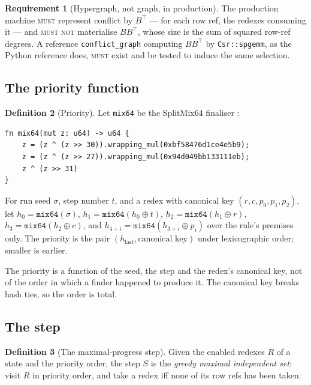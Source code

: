\documentclass[11pt,a4paper]{article}
\newcommand{\code}[1]{\texttt{#1}}
\newcommand{\MUST}{\textsc{must}}
\newcommand{\MUSTNOT}{\textsc{must not}}
\theoremstyle{definition}
\newtheorem{definition}{Definition}[section]
\newtheorem{requirement}[definition]{Requirement}
\theoremstyle{plain}
\begin{document}
\begin{requirement}[Hypergraph, not graph, in production]\label{req:hyper}
The production machine \MUST{} represent conflict by $B^{\top}$ --- for each
row ref, the redexes consuming it --- and \MUSTNOT{} materialise
$BB^{\top}$, whose size is the sum of squared row-ref degrees. A reference
\code{conflict\_graph} computing $BB^{\top}$ by \code{Csr::spgemm}, as the
Python reference does, \MUST{} exist and be tested to induce the same
selection.
\end{requirement}

\subsection{The priority function}

\begin{definition}[Priority]\label{def:prio}
Let \code{mix64} be the SplitMix64 finaliser \cite{splitmix}:
\begin{lstlisting}
fn mix64(mut z: u64) -> u64 {
    z = (z ^ (z >> 30)).wrapping_mul(0xbf58476d1ce4e5b9);
    z = (z ^ (z >> 27)).wrapping_mul(0x94d049bb133111eb);
    z ^ (z >> 31)
}
\end{lstlisting}
For run seed $\sigma$, step number $t$, and a redex with canonical key
$(r, c, p_{0}, p_{1}, p_{2})$, let
$h_{0} = \code{mix64}(\sigma)$, $h_{1} = \code{mix64}(h_{0} \oplus t)$,
$h_{2} = \code{mix64}(h_{1} \oplus r)$, $h_{3} = \code{mix64}(h_{2} \oplus c)$,
and $h_{4+i} = \code{mix64}(h_{3+i} \oplus p_{i})$ over the rule's premises
only. The priority is the pair $(h_{\mathrm{last}}, \text{canonical key})$
under lexicographic order; smaller is earlier.
\end{definition}

\noindent
The priority is a function of the seed, the step and the redex's canonical
key, not of the order in which a finder happened to produce it. The
canonical key breaks hash ties, so the order is total.

\subsection{The step}

\begin{definition}[The maximal-progress step]\label{def:step}
Given the enabled redexes $R$ of a state and the priority order, the step
$S$ is the \emph{greedy maximal independent set}: visit $R$ in priority
order, and take a redex iff none of its row refs has been taken.
\end{definition}
\end{document}
